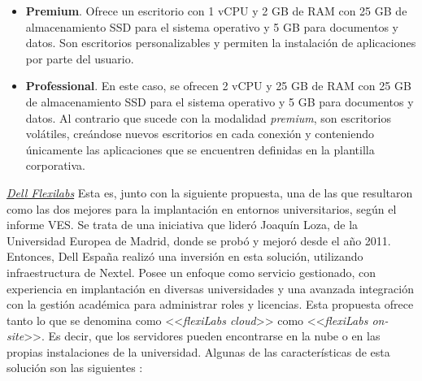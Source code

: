 \begin{itemize}
    \item \textbf{Premium}. Ofrece un escritorio con 1 v\acs{CPU} y 2 \acs{GB} de \acs{RAM} con 25 \acs{GB} de almacenamiento \acs{SSD} para el sistema operativo y 5 \acs{GB} para documentos y datos. Son escritorios personalizables y permiten la instalación de aplicaciones por parte del usuario.
    
    \item \textbf{Professional}. En este caso, se ofrecen 2 v\acs{CPU} y 25 \acs{GB} de \acs{RAM} con 25 \acs{GB} de almacenamiento \acs{SSD} para el sistema operativo y 5 \acs{GB} para documentos y datos. Al contrario que sucede con la modalidad \textit{premium}, son escritorios volátiles, creándose nuevos escritorios en cada conexión y conteniendo únicamente las aplicaciones que se encuentren definidas en la plantilla corporativa.
\end{itemize}

\clearpage

\noindent\underline{\textit{Dell Flexilabs}}\newline
\indent Esta es, junto con la siguiente propuesta, una de las que resultaron como las dos mejores para la implantación en entornos universitarios, según el informe \acs{VES}. Se trata de una iniciativa que lideró Joaquín Loza, de la Universidad Europea de Madrid, donde se probó y mejoró desde el año 2011. Entonces, Dell España realizó una inversión en esta solución, utilizando infraestructura de Nextel. Posee un enfoque como servicio gestionado, con experiencia en implantación en diversas universidades y una avanzada integración con la gestión académica para administrar roles y licencias. Esta propuesta ofrece tanto lo que se denomina como <<\textit{flexiLabs cloud}>> como <<\textit{flexiLabs on-site}>>. Es decir, que los servidores pueden encontrarse en la nube o en las propias instalaciones de la universidad. Algunas de las características de esta solución son las siguientes \cite{flexilabs}:

